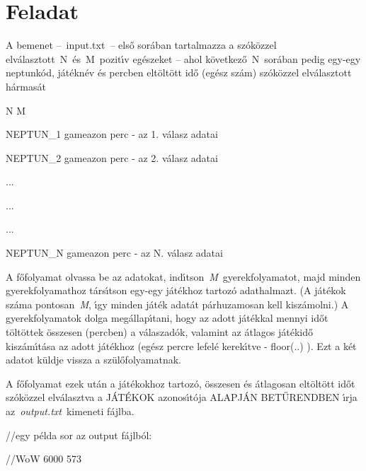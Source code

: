 \documentclass[10pt]{article}
\begin{document}
	
\section{Feladat}
	

A bemenet --~input.txt~-- els\H{o} sor\'{a}ban tartalmazza a sz\'{o}k\"{o}zzel
elv\'{a}lasztott~N~\'{e}s~M~pozit\'{\i}v eg\'{e}szeket -- ahol
k\"{o}vetkez\H{o}~N~sor\'{a}ban pedig egy-egy neptunk\'{o}d, j\'{a}t\'{e}kn\'{e}v
\'{e}s percben elt\"{o}lt\"{o}tt id\H{o} (eg\'{e}sz sz\'{a}m) sz\'{o}k\"{o}zzel
elv\'{a}lasztott h\'{a}rmas\'{a}t

\begin{center}
	{\raggedright
	{\small N M}
	}
	
	{\raggedright
	{\small NEPTUN\_1 gameazon perc   - az 1. v\'{a}lasz adatai}
	}
	
	{\raggedright
	{\small NEPTUN\_2 gameazon perc   - az 2. v\'{a}lasz adatai}
	}
	
	{\raggedright
	{\small ...}
	}
	
	{\raggedright
	{\small ...}
	}
	
	{\raggedright
	{\small ...}
	}
	
	{\raggedright
	{\small NEPTUN\_N gameazon perc   - az N. v\'{a}lasz adatai}
	}
\end{center}

{\normalsize A f\H{o}folyamat olvassa be az adatokat,
ind\'{\i}tson~\textit{M}~gyerekfolyamatot, majd minden gyerekfolyamathoz
t\'{a}rs\'{\i}tson egy-egy j\'{a}t\'{e}khoz tartoz\'{o} adathalmazt. (A
j\'{a}t\'{e}kok sz\'{a}ma pontosan~\textit{M}, \'{\i}gy minden j\'{a}t\'{e}k
adat\'{a}t p\'{a}rhuzamosan kell kisz\'{a}molni.) A gyerekfolyamatok dolga
meg\'{a}llap\'{\i}tani, hogy az adott j\'{a}t\'{e}kkal mennyi id\H{o}t
t\"{o}lt\"{o}ttek \"{o}sszesen (percben) a v\'{a}laszad\'{o}k, valamint az
\'{a}tlagos j\'{a}t\'{e}kid\H{o} kisz\'{a}m\'{\i}t\'{a}sa az adott
j\'{a}t\'{e}khoz (eg\'{e}sz percre lefel\'{e} kerek\'{\i}tve - floor(..) ). Ezt a
k\'{e}t adatot k\"{u}ldje vissza a sz\"{u}l\H{o}folyamatnak.}

{\normalsize A f\H{o}folyamat ezek ut\'{a}n a j\'{a}t\'{e}kokhoz tartoz\'{o},
\"{o}sszesen \'{e}s \'{a}tlagosan elt\"{o}lt\"{o}tt id\H{o}t sz\'{o}k\"{o}zzel
elv\'{a}lasztva a J\'{A}T\'{E}KOK azonos\'{\i}t\'{o}ja ALAPJ\'{A}N
BET\H{U}RENDBEN \'{\i}rja az~\textit{output.txt}~kimeneti f\'{a}jlba.}

\begin{center}
	{\raggedright
	{\small //egy p\'{e}lda sor az output f\'{a}jlb\'{o}l:}
	}
	
	{\raggedright
	{\small //WoW 6000 573}
	}
\end{center}
\end{document}
